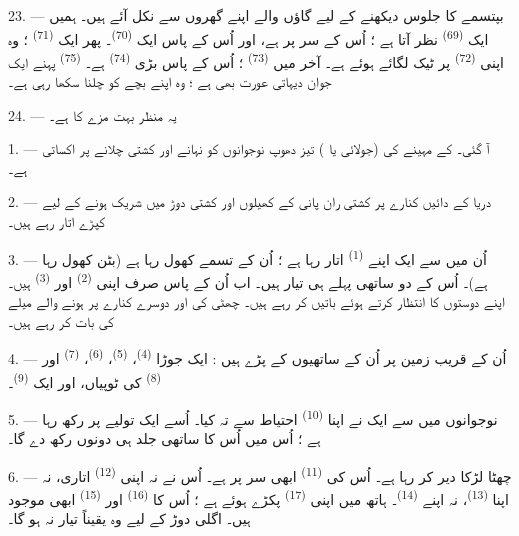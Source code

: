 23. --- بپتسمے کا جلوس دیکھنے کے لیے گاؤں والے اپنے گھروں سے نکل آئے
ہیں۔ ہمیں ایک  \textsuperscript{(69)} نظر آتا ہے ؛ اُس
کے سر پر  ہے، اور اُس کے پاس ایک  \textsuperscript{(70)}۔ پھر ایک 
\textsuperscript{(71)} ؛ وہ اپنی  \textsuperscript{(72)}
پر ٹیک لگائے ہوئے ہے۔ آخر میں 
\textsuperscript{(73)} ؛ اُس کے پاس بڑی 
\textsuperscript{(74)} ہے۔ 
\textsuperscript{(75)} پہنے ایک جوان دیہاتی عورت بھی ہے ؛ وہ اپنے بچے
کو چلنا سکھا رہی ہے۔

24. --- یہ منظر بہت مزے کا ہے۔

\VUsaut{4.0mm}
\VUsaut{3.0mm}

\VUsaut{2.4mm}

\VUsaut{3.0mm}

1. ---  آ گئی۔  کے مہینے کی (جولائی یا
) تیز دھوپ نوجوانوں کو نہانے اور کشتی چلانے پر اکساتی
ہے۔

2. --- دریا کے دائیں کنارے پر کشتی ران پانی کے کھیلوں اور کشتی دوڑ
میں شریک ہونے کے لیے کپڑے اتار رہے ہیں۔

3. --- اُن میں سے ایک اپنے  \textsuperscript{(1)} اتار
رہا ہے ؛ اُن کے تسمے کھول رہا ہے (بٹن کھول رہا ہے)۔ اُس کے دو ساتھی
پہلے ہی تیار ہیں۔ اب اُن کے پاس صرف اپنی 
\textsuperscript{(2)} اور 
\textsuperscript{(3)} ہیں۔ اپنے دوستوں کا انتظار کرتے ہوئے باتیں کر
رہے ہیں۔ چھٹی کی اور دوسرے کنارے پر ہونے والے میلے کی بات کر رہے
ہیں۔

4. --- اُن کے قریب زمین پر اُن کے ساتھیوں کے  پڑے ہیں :
ایک جوڑا  \textsuperscript{(4)}، 
\textsuperscript{(5)}،  \textsuperscript{(6)}،
 \textsuperscript{(7)} اور 
\textsuperscript{(8)} کی ٹوپیاں، اور ایک 
\textsuperscript{(9)}۔

5. --- نوجوانوں میں سے ایک نے اپنا  \textsuperscript{(10)}
احتیاط سے تہ کیا۔ اُسے ایک تولیے پر رکھ رہا ہے ؛ اُس میں اُس کا ساتھی
جلد ہی دونوں  رکھ دے گا۔

6. --- چھٹا لڑکا دیر کر رہا ہے۔ اُس کی 
\textsuperscript{(11)} ابھی سر پر ہے۔ اُس نے نہ اپنی 
\textsuperscript{(12)} اتاری، نہ اپنا  \textsuperscript{(13)}،
نہ اپنے  \textsuperscript{(14)}۔ ہاتھ میں اپنی
 \textsuperscript{(17)} پکڑے ہوئے ہے ؛ اُس کا
 \textsuperscript{(16)} اور 
\textsuperscript{(15)} ابھی موجود ہیں۔ اگلی دوڑ کے لیے وہ یقیناً تیار
نہ ہو گا۔

